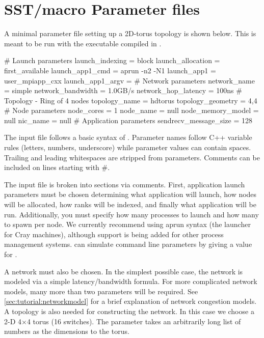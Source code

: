
\section{SST/macro Parameter files}
\label{sec:parameters}
A minimal parameter file setting up a 2D-torus topology is shown below. 
This is meant to be run with the executable compiled in .

\begin{ViFile}
# Launch parameters
launch_indexing = block
launch_allocation = first_available
launch_app1_cmd = aprun -n2 -N1
launch_app1 = user_mpiapp_cxx
launch_app1_argv = 
# Network parameters
network_name = simple
network_bandwidth = 1.0GB/s
network_hop_latency = 100ns
# Topology - Ring of 4 nodes
topology_name = hdtorus
topology_geometry = 4,4
# Node parameters
node_cores = 1
node_name = null
node_memory_model = null
nic_name = null
# Application parameters
sendrecv_message_size = 128
\end{ViFile}
The input file follows a basic syntax of .  
Parameter names follow C++ variable rules (letters, numbers, underscore) while parameter values can contain spaces.  Trailing and leading whitespaces are stripped from parameters.
Comments can be included on lines starting with \#.

The input file is broken into sections via comments.  
First, application launch parameters must be chosen determining what application will launch, 
how nodes will be allocated, how ranks will be indexed, and finally what application will be run.  
Additionally, you must specify how many processes to launch and how many to spawn per node.  
We currently recommend using aprun syntax (the launcher for Cray machines), 
although support is being added for other process management systems.
\sstmacro can simulate command line parameters by giving a value for .

A network must also be chosen.  
In the simplest possible case, the network is modeled via a simple latency/bandwidth formula.  
For more complicated network models, many more than two parameters will be required. 
See \ref{sec:tutorial:networkmodel} for a brief explanation of \sstmacro network congestion models. 
A topology is also needed for constructing the network.  
In this case we choose a 2-D 4$\times$4 torus (16 switches).  The  
parameter takes an arbitrarily long list of numbers as the dimensions to the torus.


